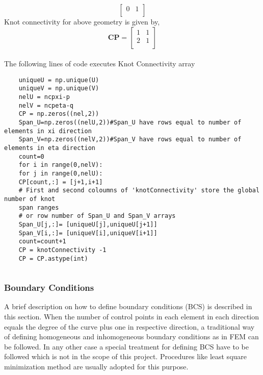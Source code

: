 \documentclass[11pt]{article}
\begin{document}
\begin{enumerate}[leftmargin=*]
\begin{equation}
\begin{bmatrix}
	0 & 1  \\
	\end{bmatrix}
	\end{equation}
	Knot connectivity for above geometry is given by,
	\begin{equation} \label{CP}
	\textbf{CP} =
	\begin{bmatrix}
	1 & 1  \\
	2 & 1  \\
	\end{bmatrix}
	\end{equation}
\\
	The following lines of code executes Knot Connectivity array
	\begin{verbatim}
	uniqueU = np.unique(U)
	uniqueV = np.unique(V)
	nelU = ncpxi-p
	nelV = ncpeta-q
	CP = np.zeros((nel,2)) 
	Span_U=np.zeros((nelU,2))#Span_U have rows equal to number of elements in xi direction
	Span_V=np.zeros((nelV,2))#Span_V have rows equal to number of elements in eta direction
	count=0
	for i in range(0,nelV):
	for j in range(0,nelU):
	CP[count,:] = [j+1,i+1] 
	# First and second coloumns of 'knotConnectivity' store the global number of knot 
	span ranges
	# or row number of Span_U and Span_V arrays
	Span_U[j,:]= [uniqueU[j],uniqueU[j+1]]
	Span_V[i,:]= [uniqueV[i],uniqueV[i+1]]
	count=count+1
	CP = knotConnectivity -1
	CP = CP.astype(int)
	\end{verbatim} 
	
	
	\begin{verbatim}

	\end{verbatim}
\end{enumerate}
\subsubsection{Boundary Conditions}
A brief description on how to define boundary conditions (BCS) is described in this section. When the number of control points in each element in each direction equals the degree of the curve plus one in respective direction, a traditional way of defining homogeneous and inhomogeneous boundary conditions as in FEM can be followed. In any other case a special treatment for defining BCS have to be followed which is not in the scope of this project. Procedures like least square minimization method are usually adopted for this purpose. 
\end{document}
